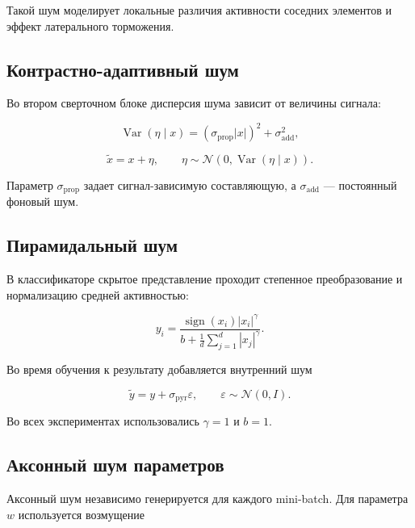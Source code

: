 \documentclass[a4paper]{article}
\begin{document}
Такой шум моделирует локальные различия активности соседних элементов и эффект латерального торможения.

\subsection{Контрастно-адаптивный шум}

Во втором сверточном блоке дисперсия шума зависит от величины сигнала:

\begin{equation}
\operatorname{Var}(\eta\mid x)=
\left(\sigma_{\mathrm{prop}}|x|\right)^2+
\sigma_{\mathrm{add}}^2,
\end{equation}

\begin{equation}
\widetilde{x}=x+\eta,
\qquad
\eta\sim\mathcal{N}\!\left(0,\operatorname{Var}(\eta\mid x)\right).
\end{equation}

Параметр $\sigma_{\mathrm{prop}}$ задает сигнал-зависимую составляющую, а $\sigma_{\mathrm{add}}$ --- постоянный фоновый шум.

\subsection{Пирамидальный шум}

В классификаторе скрытое представление проходит степенное преобразование и нормализацию средней активностью:

\begin{equation}
y_i=\frac{\operatorname{sign}(x_i)|x_i|^{\gamma}}
{b+\frac{1}{d}\sum_{j=1}^{d}|x_j|^{\gamma}}.
\end{equation}

Во время обучения к результату добавляется внутренний шум

\begin{equation}
\widetilde{y}=y+\sigma_{\mathrm{pyr}}\varepsilon,
\qquad \varepsilon\sim\mathcal{N}(0,I).
\end{equation}

Во всех экспериментах использовались $\gamma=1$ и $b=1$.

\subsection{Аксонный шум параметров}

Аксонный шум независимо генерируется для каждого mini-batch. Для параметра $w$ используется возмущение
\end{document}
